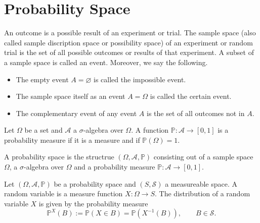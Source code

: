 \section{Probability Space}

\begin{definition}
    An outcome is a possible result of an experiment or trial. The sample space (also called sample discription space or possibility space) of an experiment or random trial is the set of all possible outcomes or results of that experiment. A subset of a sample space is called an event. Moreover, we say the following.
    \begin{itemize}
        \item The empty event \(A = \varnothing\) is called the impossible event.
        \item The sample space itself as an event \(A = \Omega\) is called the certain event.
        \item The complementary event of any event \(A\) is the set of all outcomes not in \(A\).
    \end{itemize}
\end{definition}

\begin{definition}
    Let \(\Omega\) be a set and \(\mathcal{A}\) a \(\sigma\)-algebra over \(\Omega\). A function \(\mathbb{P}: \mathcal{A} \rightarrow [0, 1]\) is a probability measure if it is a measure and if \(\mathbb{P}(\Omega) = 1\).
\end{definition}

\begin{definition}
    A probability space is the structrue \((\Omega, \mathcal{A}, \mathbb{P})\) consisting out of a sample space \(\Omega\), a \(\sigma\)-algebra over \(\Omega\) and a probability measure \(\mathbb{P}: \mathcal{A} \rightarrow [0, 1]\).
\end{definition}

\begin{definition}
    Let \((\Omega, \mathcal{A}, \mathbb{P})\) be a probability space and \((S, \mathcal{S})\) a measureable space. A random variable is a measure function \(X: \Omega \rightarrow S\). The distribution of a random variable \(X\) is given by the probability measure
    \begin{equation}
        \mathbb{P}^X (B) := \mathbb{P}(X \in B) = \mathbb{P}(X^{-1} (B)), \qquad B \in \mathcal{S} \text{.}
    \end{equation}
\end{definition}

